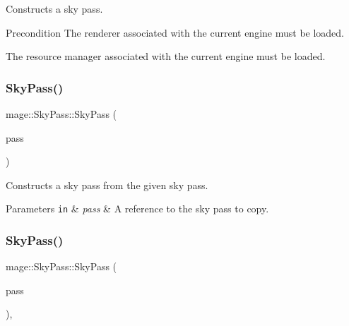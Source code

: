 Constructs a sky pass.

\begin{DoxyPrecond}{Precondition}
The renderer associated with the current engine must be loaded. 

The resource manager associated with the current engine must be loaded. 
\end{DoxyPrecond}
\hypertarget{classmage_1_1_sky_pass_a592a3543ea73c98324dcc7714b8639cf}{}\label{classmage_1_1_sky_pass_a592a3543ea73c98324dcc7714b8639cf} 
\subsubsection{\texorpdfstring{Sky\+Pass()}{SkyPass()}\hspace{0.1cm}{\footnotesize\ttfamily [2/3]}}
{\footnotesize\ttfamily mage\+::\+Sky\+Pass\+::\+Sky\+Pass (\begin{DoxyParamCaption}\item[{const \hyperlink{classmage_1_1_sky_pass}{Sky\+Pass} \&}]{pass }\end{DoxyParamCaption})\hspace{0.3cm}{\ttfamily [delete]}}

Constructs a sky pass from the given sky pass.


\begin{DoxyParams}[1]{Parameters}
\mbox{\tt in}  & {\em pass} & A reference to the sky pass to copy. \\
\hline
\end{DoxyParams}
\hypertarget{classmage_1_1_sky_pass_a0ccc1b6821e8bc3fbdf7ed2659347017}{}\label{classmage_1_1_sky_pass_a0ccc1b6821e8bc3fbdf7ed2659347017} 
\subsubsection{\texorpdfstring{Sky\+Pass()}{SkyPass()}\hspace{0.1cm}{\footnotesize\ttfamily [3/3]}}
{\footnotesize\ttfamily mage\+::\+Sky\+Pass\+::\+Sky\+Pass (\begin{DoxyParamCaption}\item[{\hyperlink{classmage_1_1_sky_pass}{Sky\+Pass} \&\&}]{pass }\end{DoxyParamCaption})\hspace{0.3cm}{\ttfamily [default]}, {\ttfamily [noexcept]}}

